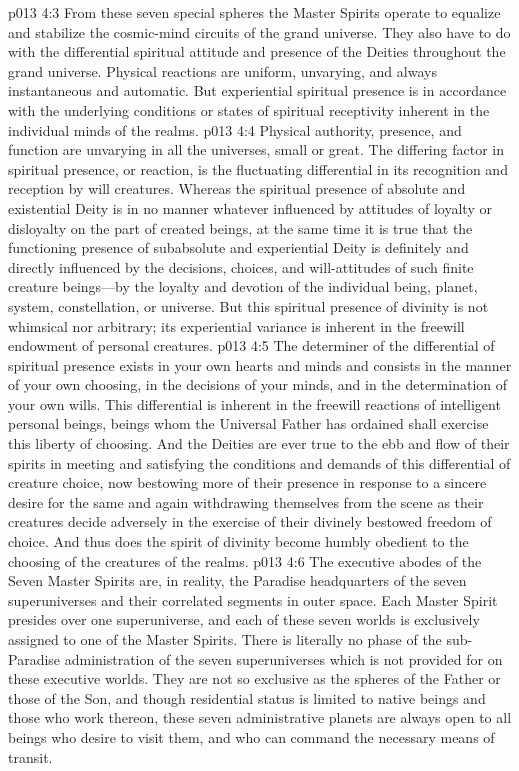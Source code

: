 \vs p013 4:3 From these seven special spheres the Master Spirits operate to equalize and stabilize the cosmic\hyp{}mind circuits of the grand universe. They also have to do with the differential spiritual attitude and presence of the Deities throughout the grand universe. Physical reactions are uniform, unvarying, and always instantaneous and automatic. But experiential spiritual presence is in accordance with the underlying conditions or states of spiritual receptivity inherent in the individual minds of the realms.
\pc \vs p013 4:4 Physical authority, presence, and function are unvarying in all the universes, small or great. The differing factor in spiritual presence, or reaction, is the fluctuating differential in its recognition and reception by will creatures. Whereas the spiritual presence of absolute and existential Deity is in no manner whatever influenced by attitudes of loyalty or disloyalty on the part of created beings, at the same time it is true that the functioning presence of subabsolute and experiential Deity is definitely and directly influenced by the decisions, choices, and will\hyp{}attitudes of such finite creature beings---by the loyalty and devotion of the individual being, planet, system, constellation, or universe. But this spiritual presence of divinity is not whimsical nor arbitrary; its experiential variance is inherent in the freewill endowment of personal creatures.
\vs p013 4:5 The determiner of the differential of spiritual presence exists in your own hearts and minds and consists in the manner of your own choosing, in the decisions of your minds, and in the determination of your own wills. This differential is inherent in the freewill reactions of intelligent personal beings, beings whom the Universal Father has ordained shall exercise this liberty of choosing. And the Deities are ever true to the ebb and flow of their spirits in meeting and satisfying the conditions and demands of this differential of creature choice, now bestowing more of their presence in response to a sincere desire for the same and again withdrawing themselves from the scene as their creatures decide adversely in the exercise of their divinely bestowed freedom of choice. And thus does the spirit of divinity become humbly obedient to the choosing of the creatures of the realms.
\pc \vs p013 4:6 The executive abodes of the Seven Master Spirits are, in reality, the Paradise headquarters of the seven superuniverses and their correlated segments in outer space. Each Master Spirit presides over one superuniverse, and each of these seven worlds is exclusively assigned to one of the Master Spirits. There is literally no phase of the sub\hyp{}Paradise administration of the seven superuniverses which is not provided for on these executive worlds. They are not so exclusive as the spheres of the Father or those of the Son, and though residential status is limited to native beings and those who work thereon, these seven administrative planets are always open to all beings who desire to visit them, and who can command the necessary means of transit.
